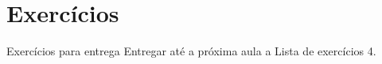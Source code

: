 \documentclass[aspectratio=169]{beamer}
\begin{document}
		\section{Exercícios}
			\begin{frame}{Exercícios para entrega}
				Entregar até a próxima aula a Lista de exercícios 4.
				
			\end{frame}
\end{document}
